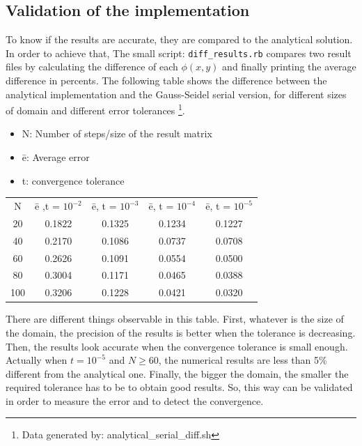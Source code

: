 \documentclass[a4paper,11pt]{article}
\begin{document}
\subsection{Validation of the implementation}

To know if the results are accurate, they are compared to the analytical solution. In order to
achieve that, The small script: \texttt{diff\_results.rb} compares two result files by calculating the
difference of each $\phi(x,y)$ and finally printing the average difference in percents. The following table shows the difference
between the analytical implementation and the Gauss-Seidel serial version, for different sizes of domain and different error tolerances
\footnote{Data generated by: analytical\_serial\_diff.sh}.

\begin{itemize}
\item{N: Number of steps/size of the result matrix}
\item{\=e: Average error}
\item{t: convergence tolerance}
\end{itemize}

\begin{center}
\begin{tabular}{c | c | c | c | c}
N & \=e ,t = $10^{-2}$ & \=e, t = $10^{-3}$ & \=e, t = $10^{-4}$ & \=e, t = $10^{-5}$ \\
20 & 0.1822 & 0.1325 & 0.1234 & 0.1227 \\
40 & 0.2170 & 0.1086 & 0.0737 & 0.0708 \\
60 & 0.2626 & 0.1091 & 0.0554 & 0.0500 \\
80 & 0.3004 & 0.1171 & 0.0465 & 0.0388 \\
100 & 0.3206 & 0.1228 & 0.0421 & 0.0320 \\
\end{tabular}
\vspace{1em}
\end{center}

There are different things observable in this table. First, whatever is the size of the domain,
the precision of the results is better when the tolerance is decreasing. Then, the results look accurate when the 
convergence tolerance is small enough. Actually when $t = 10^{-5}$ and $N \geq 60$, the numerical results are less
than 5\% different from the analytical one. Finally, the bigger the domain, the smaller the required
tolerance has to be to obtain good results. So, this way can be validated in order to measure the error and to detect the
convergence.
\end{document}
